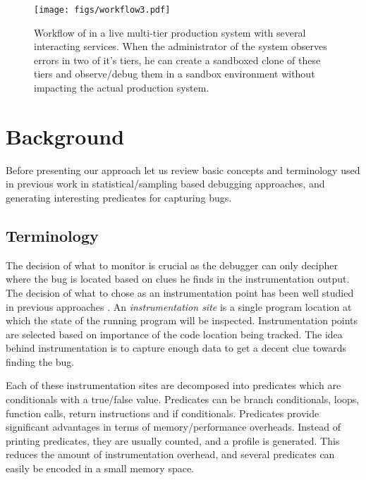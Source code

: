 
\begin{figure*}[ht!]
	\begin{center}
		\texttt{[image: figs/workflow3.pdf]}
		\caption{Workflow of \parikshan in a live multi-tier production system with several interacting services. When the administrator of the system observes errors in two of it's tiers, he can create a sandboxed clone of these tiers and observe/debug them in a sandbox environment without impacting the actual production system.}
		\label{fig:motivation}
	\end{center}
\end{figure*}


\section{Background}
\label{sec:background}

Before presenting our approach let us review basic concepts and terminology used in previous work in statistical/sampling based debugging approaches, and generating interesting predicates for capturing bugs.

\subsection{Terminology}
\label{sec: terminology-guided}



The decision of what to monitor is crucial as the debugger can only decipher where the bug is located based on clues he  finds in the instrumentation output.
The decision of what to chose as an instrumentation point has been well studied in previous approaches \cite{}.
An \emph{instrumentation site} is a single program location at which the state of the running program will be inspected.
Instrumentation points are selected based on importance of the code location being tracked.
The idea behind instrumentation is to capture enough data to get a decent clue towards finding the bug.

Each of these instrumentation sites are decomposed into predicates which are conditionals with a true/false value.
Predicates can be branch conditionals, loops, function calls, return instructions and if conditionals.
Predicates provide significant advantages in terms of memory/performance overheads.
Instead of printing predicates, they are usually counted, and a profile is generated.
This reduces the amount of instrumentation overhead, and several predicates can easily be encoded in a small memory space.

